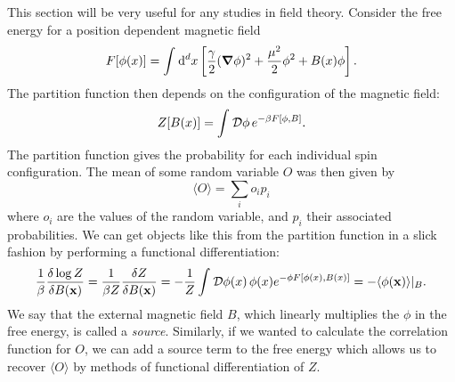 This section will be very useful for any studies in field theory. 
Consider the free energy for a position dependent magnetic field
\begin{equation}
  F[\phi(x)] = \int_{}^{} \dd[d]{x} \left[ \frac{\gamma}{2}(\grad \phi)^2 + \frac{\mu^2}{2} \phi^2 + B(x) \phi \right].
\end{equation}
The partition function then depends on the configuration of the magnetic field:
\begin{equation}
  Z[B(x)] = \int_{}^{} \mathop{\mathcal{D} \phi} e^{-\beta F [\phi, B]}.
\end{equation}
The partition function gives the probability for each individual spin configuration. The mean of some random variable $O$ was then given by
\begin{equation}
  \langle O \rangle = \sum_{i} o_i p_i
\end{equation}
where $o_i$ are the values of the random variable, and $p_i$ their associated probabilities.
We can get objects like this from the partition function in a slick fashion by performing a functional differentiation:
\begin{equation}
  \frac{1}{\beta} \fdv{\log Z}{B(\vb{x})} = \frac{1}{\beta Z} \fdv{Z}{B(\vb{x})} = -\frac{1}{Z} \int_{}^{} \pdd{\phi(x)} \phi(x) e^{-\phi F[\phi(x), B(x)]} = - \langle \phi(\vb{x}) \rangle\rvert_{B}.
\end{equation}
We say that the external magnetic field $B$, which linearly multiplies the $\phi$ in the free energy, is called a \emph{source}. Similarly, if we wanted to calculate the correlation function for $O$, we can add a source term to the free energy which allows us to recover $\langle O \rangle$ by methods of functional differentiation of $Z$.
